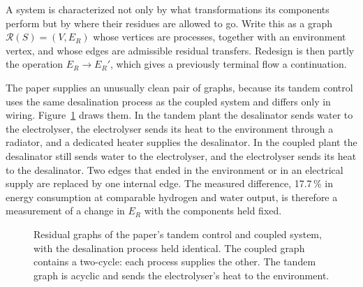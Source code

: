 \documentclass[11pt]{article}
\theoremstyle{definition}
\theoremstyle{remark}
\begin{document}
A system is characterized not only by what transformations its components perform but by where their residues are allowed to go. Write this as a graph $\mathcal{R}(S)=(V,E_R)$ whose vertices are processes, together with an environment vertex, and whose edges are admissible residual transfers. Redesign is then partly the operation $E_R\to E_R'$, which gives a previously terminal flow a continuation.

The paper supplies an unusually clean pair of graphs, because its tandem control uses the same desalination process as the coupled system and differs only in wiring. Figure~\ref{fig:graphs} draws them. In the tandem plant the desalinator sends water to the electrolyser, the electrolyser sends its heat to the environment through a radiator, and a dedicated heater supplies the desalinator. In the coupled plant the desalinator still sends water to the electrolyser, and the electrolyser sends its heat to the desalinator. Two edges that ended in the environment or in an electrical supply are replaced by one internal edge. The measured difference, 17.7\,\% in energy consumption at comparable hydrogen and water output, is therefore a measurement of a change in $E_R$ with the components held fixed.

\begin{figure}[t]
\centering
{}
\caption{Residual graphs of the paper's tandem control and coupled system, with the desalination process held identical. The coupled graph contains a two-cycle: each process supplies the other. The tandem graph is acyclic and sends the electrolyser's heat to the environment.}
\label{fig:graphs}
\end{figure}
\end{document}
